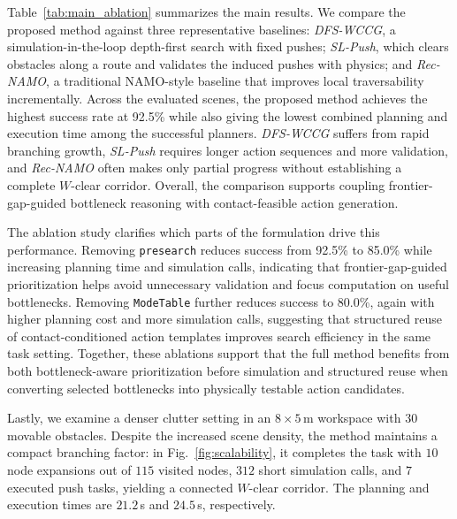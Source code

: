 Table~\ref{tab:main_ablation} summarizes the main results. We compare the
proposed method against three representative baselines: \emph{DFS-WCCG}, a
simulation-in-the-loop depth-first search with fixed pushes; \emph{SL-Push},
which clears obstacles along a route and validates the induced pushes with
physics; and \emph{Rec-NAMO}, a traditional NAMO-style baseline that improves
local traversability incrementally. Across the evaluated scenes, the proposed
method achieves the highest success rate at 92.5\% while also giving the
lowest combined planning and execution time among the successful planners.
\emph{DFS-WCCG} suffers from rapid branching growth, \emph{SL-Push} requires
longer action sequences and more validation, and \emph{Rec-NAMO} often makes
only partial progress without establishing a complete $W$-clear corridor.
Overall, the comparison supports coupling frontier-gap-guided bottleneck
reasoning with contact-feasible action generation.

The ablation study clarifies which parts of the formulation drive this
performance. Removing \texttt{presearch} reduces success from 92.5\% to 85.0\%
while increasing planning time and simulation calls, indicating that
frontier-gap-guided prioritization helps avoid unnecessary validation and
focus computation on useful bottlenecks. Removing \texttt{ModeTable} further
reduces success to 80.0\%, again with higher planning cost and more
simulation calls, suggesting that structured reuse of contact-conditioned
action templates improves search efficiency in the same task setting.
Together, these ablations support that the full method benefits from both
bottleneck-aware prioritization before simulation and structured reuse when
converting selected bottlenecks into physically testable action candidates.

Lastly, we examine a denser clutter setting in an $8\times5$\,m workspace
with $30$ movable obstacles. Despite the increased scene density, the method
maintains a compact branching factor: in Fig.~\ref{fig:scalability}, it
completes the task with $10$ node expansions out of $115$ visited nodes,
$312$ short simulation calls, and $7$ executed push tasks, yielding a
connected $W$-clear corridor. The planning and execution times are
$21.2$\,s and $24.5$\,s, respectively.

